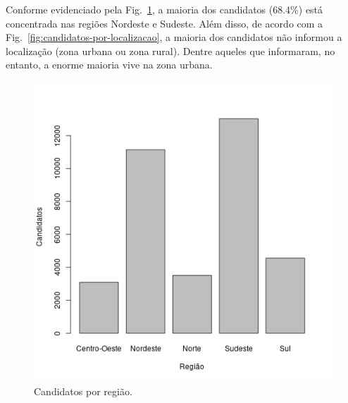 \documentclass[12pt]{article}
\newcommand{\reffig}[1]{Fig.~\ref{fig:#1}}
\begin{document}
Conforme evidenciado pela \reffig{candidatos-por-regiao}, a maioria dos candidatos (68.4\%) está concentrada nas regiões Nordeste e Sudeste.
Além disso, de acordo com a \reffig{candidatos-por-localizacao}, a maioria dos candidatos não informou a localização (zona urbana ou zona rural).
Dentre aqueles que informaram, no entanto, a enorme maioria vive na zona urbana.
\begin{minipage}{.5\textwidth}
    \begin{figure}[H]
    \includegraphics[width=\linewidth]{../geral_candidatos-por-regiao.png}
    \caption{Candidatos por região.}
    \label{fig:candidatos-por-regiao}
    \end{figure}
\end{minipage}%
\end{document}
